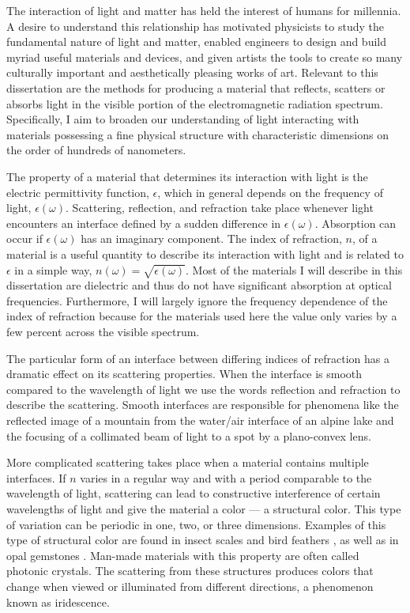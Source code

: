 The interaction of light and matter has held the interest of humans for millennia.
A desire to understand this relationship has motivated physicists to study the fundamental nature of light and matter, enabled engineers to design and build myriad useful materials and devices, and given artists the tools to create so many culturally important and aesthetically pleasing works of art.
Relevant to this dissertation are the methods for producing a material that reflects, scatters or absorbs light in the visible portion of the electromagnetic radiation spectrum.
Specifically, I aim to broaden our understanding of light interacting with materials possessing a fine physical structure with characteristic dimensions on the order of hundreds of nanometers.

The property of a material that determines its interaction with light is the electric permittivity function, $\epsilon$, which in general depends on the frequency of light, $\epsilon(\omega)$.
Scattering, reflection, and refraction take place whenever light encounters an interface defined by a sudden difference in $\epsilon(\omega)$.
Absorption can occur if $\epsilon(\omega)$ has an imaginary component.
The index of refraction, $n$, of a material is a useful quantity to describe its interaction with light and is related to $\epsilon$ in a simple way, $n(\omega) = \sqrt{\epsilon(\omega)}$.
Most of the materials I will describe in this dissertation are dielectric and thus do not have significant absorption at optical frequencies.
Furthermore, I will largely ignore the frequency dependence of the index  of refraction because for the materials used here the value only varies by a few percent across the visible spectrum.

The particular form of an interface between differing indices of refraction has a dramatic effect on its scattering properties.
When the interface is smooth compared to the wavelength of light we use the words reflection and refraction to describe the scattering.
Smooth interfaces are responsible for phenomena like the reflected image of a mountain from the water/air interface of an alpine lake and the focusing of a collimated beam of light to a spot by a plano-convex lens.

More complicated scattering takes place when a material contains multiple interfaces.
If $n$ varies in a regular way and with a period comparable to the wavelength of light, scattering can lead to constructive interference of certain wavelengths of light and give the material a color --- a structural color.
This type of variation can be periodic in one, two, or three dimensions.
Examples of this type of structural color are found in insect scales and bird feathers \cite{Srinivasarao:1999p9327, Vukusic:2003p1380, Parker:2007p11434, Welch:2007p1313, Kinoshita:2008p10935}, as well as in opal gemstones \cite{Sanders1968}.
Man-made materials with this property are often called photonic crystals.
The scattering from these structures produces colors that change when viewed or illuminated from different directions, a phenomenon known as iridescence.

